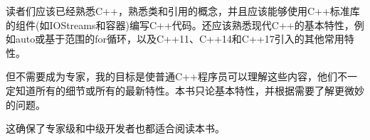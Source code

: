 读者们应该已经熟悉C++，熟悉类和引用的概念，并且应该能够使用C++标准库的组件(如IOStreams和容器)编写C++代码。还应该熟悉现代C++的基本特性，例如auto或基于范围的for循环，以及C++11、C++14和C++17引入的其他常用特性。

但不需要成为专家，我的目标是使普通C++程序员可以理解这些内容，他们不一定知道所有的细节或所有的最新特性。本书只论基本特性，并根据需要了解更微妙的问题。

这确保了专家级和中级开发者也都适合阅读本书。